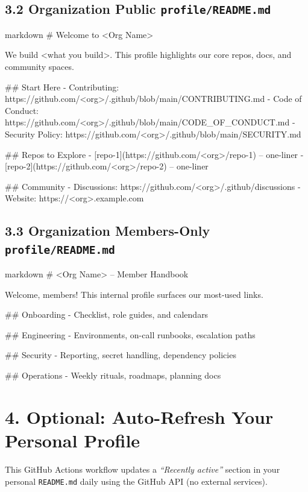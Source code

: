 \documentclass[11pt]{article}
\renewcommand{\kbd}[1]{\texttt{#1}}
\begin{document}
\subsection*{3.2 Organization Public \texttt{profile/README.md}}
\begin{code}{markdown}
# Welcome to <Org Name>

We build <what you build>. This profile highlights our core repos, docs, and community spaces.

## Start Here
- Contributing: https://github.com/<org>/.github/blob/main/CONTRIBUTING.md
- Code of Conduct: https://github.com/<org>/.github/blob/main/CODE_OF_CONDUCT.md
- Security Policy: https://github.com/<org>/.github/blob/main/SECURITY.md

## Repos to Explore
- [repo-1](https://github.com/<org>/repo-1) -- one-liner
- [repo-2](https://github.com/<org>/repo-2) -- one-liner

## Community
- Discussions: https://github.com/<org>/.github/discussions
- Website: https://<org>.example.com
\end{code}

\subsection*{3.3 Organization Members-Only \texttt{profile/README.md}}
\begin{code}{markdown}
# <Org Name> -- Member Handbook

Welcome, members! This internal profile surfaces our most-used links.

## Onboarding
- Checklist, role guides, and calendars

## Engineering
- Environments, on-call runbooks, escalation paths

## Security
- Reporting, secret handling, dependency policies

## Operations
- Weekly rituals, roadmaps, planning docs
\end{code}

\section*{4. Optional: Auto-Refresh Your Personal Profile}

\noindent
This GitHub Actions workflow updates a \emph{``Recently active''} section in your personal \kbd{README.md} daily using the GitHub API (no external services).
\end{document}
